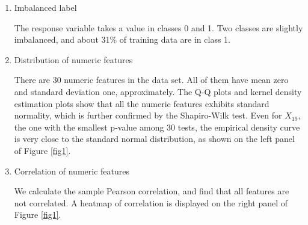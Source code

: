 \documentclass[11pt]{article}
\begin{document}
\begin{enumerate}

    \item Imbalanced label
    
    The response variable takes a value in classes 0 and 1. 
    Two classes are slightly imbalanced, and about 31\% of training data are in class 1.
    
    \item Distribution of numeric features 
    
    There are 30 numeric features in the data set. 
    All of them have mean zero and standard deviation one, approximately. The Q-Q plots and kernel density estimation plots show that all the numeric features exhibits standard normality, which is further confirmed by the Shapiro-Wilk test. Even for $X_{19}$, the one with the smallest p-value among 30 tests, the empirical density curve is very close to the standard normal distribution, as shown on the left panel of Figure \ref{fig1}.
    
    \item Correlation of numeric features
    
    We calculate the sample Pearson correlation, and find that all features are not correlated. A heatmap of correlation is displayed on the right panel of Figure \ref{fig1}.
    

\end{enumerate}
\end{document}
